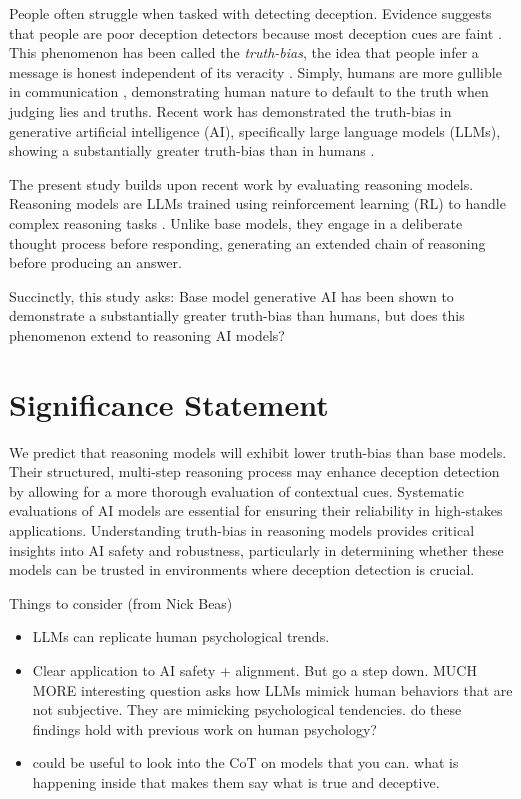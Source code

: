\documentclass{article}
\begin{document}
People often struggle when tasked with detecting deception. Evidence suggests that people are poor deception detectors because most deception cues are faint \citep{depaulo_cues_2003, hartwig_why_2011,luke_lessons_2019}. This phenomenon has been called the \textit{truth-bias}, the idea that people infer a message is honest independent of its veracity \citep{levine_truth-default_2014, mclaughlin_communication_2012}. Simply, humans are more gullible in communication \citep{levine_duped_2020}, demonstrating human nature to default to the truth when judging lies and truths. Recent work has demonstrated the truth-bias in generative artificial intelligence (AI), specifically large language models (LLMs), showing a substantially greater truth-bias than in humans \citep{markowitz_generative_2024}.

The present study builds upon recent work \citep{markowitz_generative_2024} by evaluating reasoning models. Reasoning models are LLMs trained using reinforcement learning (RL) to handle complex reasoning tasks \citep{openai_reasoning_2025}. Unlike base models, they engage in a deliberate thought process before responding, generating an extended chain of reasoning before producing an answer.

Succinctly, this study asks: Base model generative AI has been shown to demonstrate a substantially greater truth-bias than humans, but does this phenomenon extend to reasoning AI models?

\section{Significance Statement}

We predict that reasoning models will exhibit lower truth-bias than base models. Their structured, multi-step reasoning process may enhance deception detection by allowing for a more thorough evaluation of contextual cues. Systematic evaluations of AI models are essential for ensuring their reliability in high-stakes applications. Understanding truth-bias in reasoning models provides critical insights into AI safety and robustness, particularly in determining whether these models can be trusted in environments where deception detection is crucial.

Things to consider (from Nick Beas)
\begin{itemize}
    \item LLMs can replicate human psychological trends.
    \item Clear application to AI safety + alignment. But go a step down. MUCH MORE interesting question asks how LLMs mimick human behaviors that are not subjective. They are mimicking psychological tendencies. do these findings hold with previous work on human psychology?
    \item could be useful to look into the CoT on models that you can. what is happening inside that makes them say what is true and deceptive.
\end{itemize}



\end{document}
